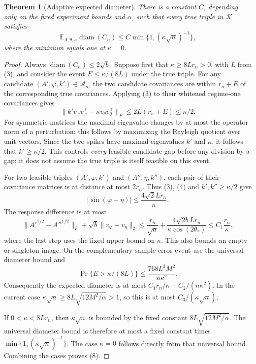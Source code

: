\documentclass[11pt]{article}
\newtheorem{theorem}{Theorem}
\theoremstyle{definition}
\begin{document}
\begin{theorem}[Adaptive expected diameter]
There is a constant $C$, depending only on the fixed experiment bounds
and $\alpha$, such that every true triple in $\mathcal K$ satisfies
\[
 \mathbb E_{A,\theta,\kappa}\operatorname{diam}(C_n)
 \le C\min\{1,(\kappa\sqrt n)^{-1}\},               \tag{8}
\]
where the minimum equals one at $\kappa=0$.
\end{theorem}
\begin{proof}
Always $\operatorname{diam}(C_n)\le2\sqrt b$.
Suppose first that $\kappa\ge8Lr_n>0$, with $L$ from (3), and
consider the event $E\le\kappa/(8L)$ under the true triple.
For any candidate $(A',\varphi,k')\in\mathcal A_n$, the two
candidate covariances are within $r_n+E$ of the corresponding true
covariances. Applying (3) to their whitened regime-one covariances gives
\[
 \|k'v_\varphi v_\varphi^\top-
                 \kappa v_\theta v_\theta^\top\|_F
 \le2L(r_n+E)\le\kappa/2.
\]
For symmetric matrices the maximal eigenvalue changes by at most the
operator norm of a perturbation: this follows by maximizing the Rayleigh
quotient over unit vectors. Since the two spikes have maximal eigenvalues
$k'$ and $\kappa$, it follows that $k'\ge\kappa/2$.
This controls \emph{every} feasible candidate gap before any division by
a gap; it does not assume the true triple is itself feasible on this event.

For two feasible triples $(A',\varphi,k')$ and $(A'',\eta,k'')$,
each pair of their covariance matrices is at distance at most $2r_n$.
Thus (3), (4) and $k',k''\ge\kappa/2$ give
\[
 |\sin(\varphi-\eta)|\le\frac{4\sqrt2Lr_n}{\kappa}.
\]
The response difference is at most
\[
 \|A'^{1/2}-A''^{1/2}\|_F
       +\sqrt b\|v_\varphi-v_\eta\|_2
 \le\frac{r_n}{\sqrt a}
       +\frac{4\sqrt{2b}Lr_n}{\kappa\cos(2\theta_*)}
 \le C_1\frac{r_n}{\kappa},                           \tag{9}
\]
where the last step uses the fixed upper bound on $\kappa$.
This also bounds an empty or singleton image. On the complementary
sample-error event use the universal diameter bound and
\[
 \Pr\{E>\kappa/(8L)\}\le\frac{768L^2M^2}{n\kappa^2}.
\]
Consequently the expected diameter is at most
$C_1r_n/\kappa+C_2/(n\kappa^2)$.
In the current case $\kappa\sqrt n\ge8L\sqrt{12M^2/\alpha}>1$,
so this is at most $C_3/(\kappa\sqrt n)$.

If $0<\kappa<8Lr_n$, then $\kappa\sqrt n$ is bounded by the
fixed constant $8L\sqrt{12M^2/\alpha}$. The universal diameter bound
is therefore at most a fixed constant times
$\min\{1,(\kappa\sqrt n)^{-1}\}$. The case $\kappa=0$ follows
directly from that universal bound. Combining the cases proves (8).
\end{proof}
\end{document}
